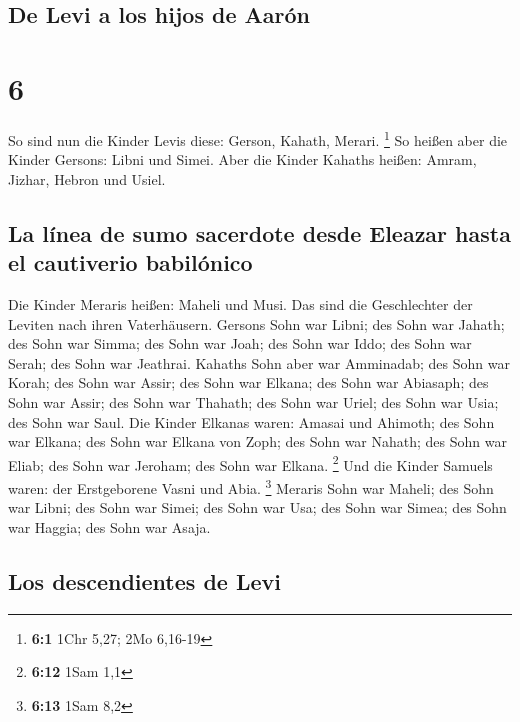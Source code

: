 \hypertarget{de-levi-a-los-hijos-de-aaruxf3n}{%
\subsection{De Levi a los hijos de
Aarón}\label{de-levi-a-los-hijos-de-aaruxf3n}}

\hypertarget{section-5}{%
\section{6}\label{section-5}}

 So sind nun die Kinder Levis diese: Gerson, Kahath,
Merari. \footnote{\textbf{6:1} 1Chr 5,27; 2Mo 6,16-19}  So
heißen aber die Kinder Gersons: Libni und Simei.  Aber die
Kinder Kahaths heißen: Amram, Jizhar, Hebron und Usiel.

\hypertarget{la-luxednea-de-sumo-sacerdote-desde-eleazar-hasta-el-cautiverio-babiluxf3nico}{%
\subsection{La línea de sumo sacerdote desde Eleazar hasta el cautiverio
babilónico}\label{la-luxednea-de-sumo-sacerdote-desde-eleazar-hasta-el-cautiverio-babiluxf3nico}}

 Die Kinder Meraris heißen: Maheli und Musi. Das sind die
Geschlechter der Leviten nach ihren Vaterhäusern.  Gersons
Sohn war Libni; des Sohn war Jahath; des Sohn war Simma; 
des Sohn war Joah; des Sohn war Iddo; des Sohn war Serah; des Sohn war
Jeathrai.  Kahaths Sohn aber war Amminadab; des Sohn war
Korah; des Sohn war Assir;  des Sohn war Elkana; des Sohn
war Abiasaph; des Sohn war Assir;  des Sohn war Thahath;
des Sohn war Uriel; des Sohn war Usia; des Sohn war Saul.
 Die Kinder Elkanas waren: Amasai und Ahimoth;
 des Sohn war Elkana; des Sohn war Elkana von Zoph; des
Sohn war Nahath;  des Sohn war Eliab; des Sohn war
Jeroham; des Sohn war Elkana. \footnote{\textbf{6:12} 1Sam 1,1}
 Und die Kinder Samuels waren: der Erstgeborene Vasni und
Abia. \footnote{\textbf{6:13} 1Sam 8,2}  Meraris Sohn war
Maheli; des Sohn war Libni; des Sohn war Simei; des Sohn war Usa;
 des Sohn war Simea; des Sohn war Haggia; des Sohn war
Asaja.

\hypertarget{los-descendientes-de-levi}{%
\subsection{Los descendientes de Levi}\label{los-descendientes-de-levi}}


